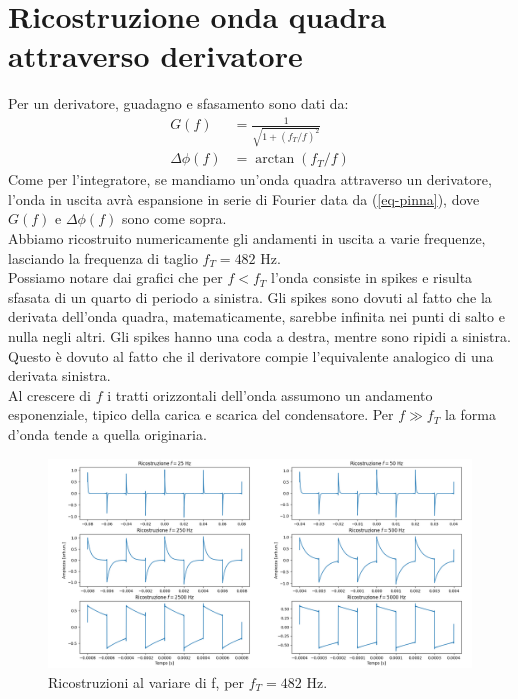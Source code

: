 \documentclass{article}[a4paper, oneside,11pt]
\begin{document}
\section{Ricostruzione onda quadra attraverso derivatore}
    Per un derivatore, guadagno e sfasamento sono dati da:
    \begin{align*}
        G(f) &= \frac{1}{\sqrt{1+(f_T/f)^2}}\\
        \Delta\phi(f) &= \arctan(f_T/f)
    \end{align*}
    Come per l'integratore, se mandiamo un'onda quadra attraverso un derivatore, l'onda in uscita avrà espansione in serie di Fourier data da (\ref{eq-pinna}), dove $G(f)$ e $\Delta\phi(f)$ sono come sopra.\\
    Abbiamo ricostruito numericamente gli andamenti in uscita a varie frequenze, lasciando la frequenza di taglio $f_T = 482$ Hz.\\
    Possiamo notare dai grafici che per $f<f_T$ l'onda consiste in spikes e risulta sfasata di un quarto di periodo a sinistra. Gli spikes sono dovuti al fatto che la derivata dell'onda quadra, matematicamente, sarebbe infinita nei punti di salto e nulla negli altri. Gli spikes hanno una coda a destra, mentre sono ripidi a sinistra. Questo è dovuto al fatto che il derivatore compie l'equivalente analogico di una derivata sinistra.\\ 
    Al crescere di $f$ i tratti orizzontali dell'onda assumono un andamento esponenziale, tipico della carica e scarica del condensatore. Per $f\gg f_T$ la forma d'onda tende a quella originaria.
    \begin{figure}[H]\label{fig:derivatore}
        \centering
        \includegraphics[width=1.0\textwidth]{img/Ricostruzione_spikes.png}
        \caption{Ricostruzioni al variare di f, per $f_T = 482$ Hz.}
    \end{figure}
    
\end{document}
